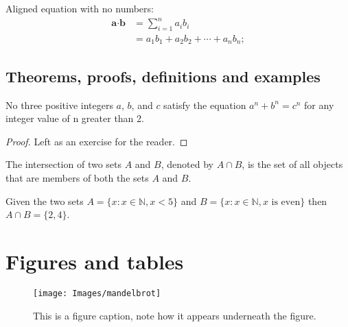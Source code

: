Aligned equation with no numbers:
\begin{align*} %
	\label{eq:dot product}
	\textbf{a} \cdot \textbf{b} &= \sum_{i=1}^n a_ib_i \\
	&= a_1b_1 + a_2b_2 + \cdots + a_nb_n;
\end{align*}

\subsection{Theorems, proofs, definitions and examples}

\begin{theorem}
No three positive integers $a$, $b$, and $c$ satisfy the equation $a^n + b^n = c^n$ for any integer value of n greater than 2.
\end{theorem}

\begin{proof}
Left as an exercise for the reader.
\end{proof}

\begin{definition}
The intersection of two sets $A$ and $B$, denoted by $A \cap B$, is the set of all objects that are members of both the sets $A$ and $B$.
\end{definition}

\begin{example}
Given the two sets $A = \{x:x\in \mathbb{N}, x < 5\}$ and $B = \{x:x \in \mathbb{N}, x \text{ is even}\}$ then $A \cap B = \{2, 4\}$.
\end{example}


\section{Figures and tables}

\begin{figure}[H]
	\begin{center}
		\texttt{[image: Images/mandelbrot]} %
		\caption{This is a figure caption, note how it appears underneath the figure.} %
		\label{fig:figure label} %
	\end{center}
\end{figure}

